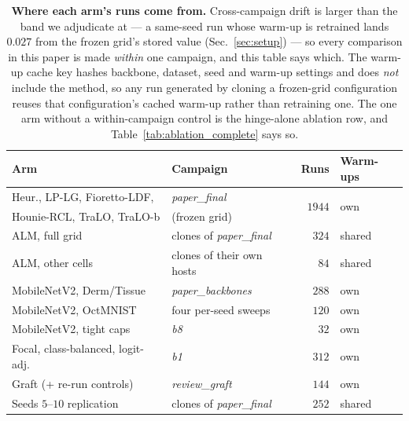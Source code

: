 \begin{table}[t]\centering\small\color{blue}
\setlength{\tabcolsep}{4pt}
\caption{\color{blue}\textbf{Where each arm's runs come from.}
Cross-campaign drift is larger than the band we adjudicate at --- a same-seed run
whose warm-up is retrained lands $0.027$ from the frozen grid's stored value
(Sec.~\ref{sec:setup}) --- so every comparison in this paper is made
\emph{within} one campaign, and this table says which. The warm-up cache key
hashes backbone, dataset, seed and warm-up settings and does \emph{not} include
the method, so any run generated by cloning a frozen-grid configuration reuses
that configuration's cached warm-up rather than retraining one. The one arm
without a within-campaign control is the hinge-alone ablation row, and
Table~\ref{tab:ablation_complete} says so.}
\label{tab:provenance}
\begin{tabular}{l l r l}
\toprule
Arm & Campaign & Runs & Warm-ups \\
\midrule
Heur., LP-LG, Fioretto-LDF,      & \emph{paper\_final} & \multirow{2}{*}{$1944$} & \multirow{2}{*}{own} \\
\;Hounie-RCL, TraLO, TraLO-b     & (frozen grid)       &                         & \\
\addlinespace[1.5pt]
ALM, full grid                   & clones of \emph{paper\_final} & $324$ & shared \\
ALM, other cells                 & clones of their own hosts & $84$ & shared \\
\addlinespace[1.5pt]
MobileNetV2, Derm/Tissue         & \emph{paper\_backbones} & $288$ & own \\
MobileNetV2, OctMNIST            & four per-seed sweeps & $120$ & own \\
MobileNetV2, tight caps          & \emph{b8} & $32$ & own \\
\addlinespace[1.5pt]
Focal, class-balanced, logit-adj.& \emph{b1} & $312$ & own \\
Graft (+ re-run controls)        & \emph{review\_graft} & $144$ & own \\
Seeds $5$--$10$ replication      & clones of \emph{paper\_final} & $252$ & shared \\
\bottomrule
\end{tabular}
\end{table}
